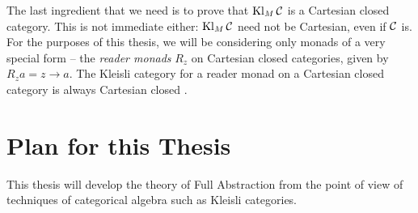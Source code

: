 \documentclass[11pt]{report}
\begin{document}
The last ingredient that we need is to prove that $\operatorname{Kl}_M{\mathcal{C}}$ is a Cartesian closed category.  
This is not immediate either: $\operatorname{Kl}_M{\mathcal{C}}$ need not be Cartesian, even if ${\mathcal{C}}$ is.  
For the purposes of this thesis, we will be considering only monads of a very special form -- the \emph{reader monads} $R_z$ on Cartesian closed categories, given by $R_za = z \to a$.
The Kleisli category for a reader monad on a Cartesian closed category is always Cartesian closed \cite{FunctionalCompleteness}.

\section{Plan for this Thesis}

This thesis will develop the theory of Full Abstraction from the point of view of techniques of categorical algebra such as Kleisli categories.
\end{document}
